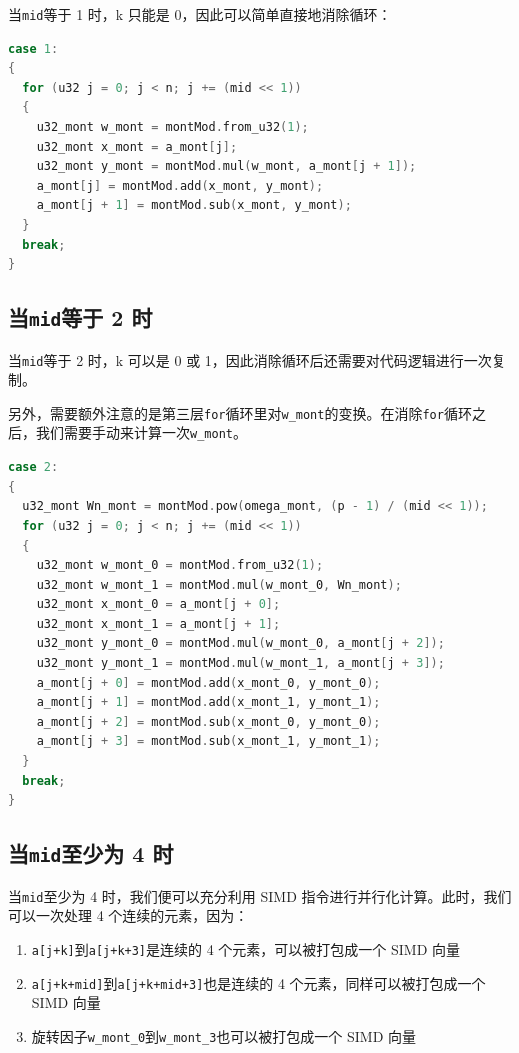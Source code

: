 \documentclass[a4paper]{article}
\begin{document}
当\texttt{mid}等于 1 时，k 只能是 0，因此可以简单直接地消除循环：

\begin{lstlisting}[language=C++]
case 1:
{
  for (u32 j = 0; j < n; j += (mid << 1))
  {
    u32_mont w_mont = montMod.from_u32(1);
    u32_mont x_mont = a_mont[j];
    u32_mont y_mont = montMod.mul(w_mont, a_mont[j + 1]);
    a_mont[j] = montMod.add(x_mont, y_mont);
    a_mont[j + 1] = montMod.sub(x_mont, y_mont);
  }
  break;
}
\end{lstlisting}

\subsection{当\texttt{mid}等于 2 时}

当\texttt{mid}等于 2 时，k 可以是 0 或 1，因此消除循环后还需要对代码逻辑进行一次复制。

另外，需要额外注意的是第三层\texttt{for}循环里对\texttt{w\_mont}的变换。在消除\texttt{for}循环之后，我们需要手动来计算一次\texttt{w\_mont}。

\begin{lstlisting}[language=C++]
case 2:
{
  u32_mont Wn_mont = montMod.pow(omega_mont, (p - 1) / (mid << 1));
  for (u32 j = 0; j < n; j += (mid << 1))
  {
    u32_mont w_mont_0 = montMod.from_u32(1);
    u32_mont w_mont_1 = montMod.mul(w_mont_0, Wn_mont);
    u32_mont x_mont_0 = a_mont[j + 0];
    u32_mont x_mont_1 = a_mont[j + 1];
    u32_mont y_mont_0 = montMod.mul(w_mont_0, a_mont[j + 2]);
    u32_mont y_mont_1 = montMod.mul(w_mont_1, a_mont[j + 3]);
    a_mont[j + 0] = montMod.add(x_mont_0, y_mont_0);
    a_mont[j + 1] = montMod.add(x_mont_1, y_mont_1);
    a_mont[j + 2] = montMod.sub(x_mont_0, y_mont_0);
    a_mont[j + 3] = montMod.sub(x_mont_1, y_mont_1);
  }
  break;
}
\end{lstlisting}

\subsection{当\texttt{mid}至少为 4 时}

当\texttt{mid}至少为 4 时，我们便可以充分利用 SIMD 指令进行并行化计算。此时，我们可以一次处理 4 个连续的元素，因为：

\begin{enumerate}
    \item \texttt{a[j+k]}到\texttt{a[j+k+3]}是连续的 4 个元素，可以被打包成一个 SIMD 向量
    \item \texttt{a[j+k+mid]}到\texttt{a[j+k+mid+3]}也是连续的 4 个元素，同样可以被打包成一个 SIMD 向量
    \item 旋转因子\texttt{w\_mont\_0}到\texttt{w\_mont\_3}也可以被打包成一个 SIMD 向量
\end{enumerate}
\end{document}
